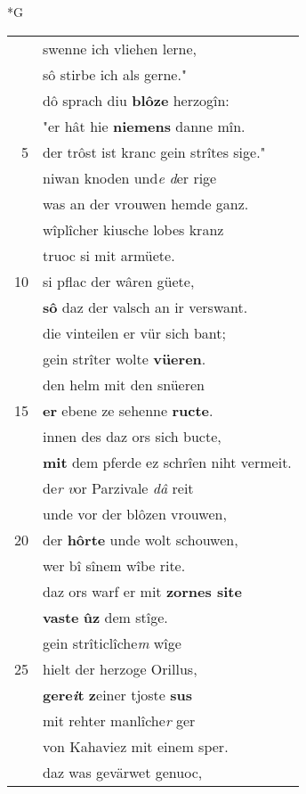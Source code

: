 \documentclass[8pt,a4paper,notitlepage]{article}
\begin{document}
\begin{table}[ht]
\begin{minipage}[t]{0.5\linewidth}
\small
\begin{center}*G
\end{center}
\begin{tabular}{rl}
 & swenne ich vliehen lerne,\\ 
 & sô stirbe ich als gerne."\\ 
 & dô sprach diu \textbf{blôze} herzogîn:\\ 
 & "er hât hie \textbf{niemens} danne mîn.\\ 
5 & der trôst ist kranc gein strîtes sige."\\ 
 & niwan knoden und\textit{e d}er rige\\ 
 & was an der vrouwen hemde ganz.\\ 
 & wîplîcher kiusche lobes kranz\\ 
 & truoc si mit armüete.\\ 
10 & si pflac der wâren güete,\\ 
 & \textbf{sô} daz der valsch an ir verswant.\\ 
 & die vinteilen er vür sich bant;\\ 
 & gein strîter wolte \textbf{vüeren}.\\ 
 & den helm mit den snüeren\\ 
15 & \textbf{er} ebene ze sehenne \textbf{ructe}.\\ 
 & innen des daz ors sich bucte,\\ 
 & \textbf{mit} dem pferde ez schrîen niht vermeit.\\ 
 & de\textit{r} \textit{v}or Parzivale \textit{dâ} reit\\ 
 & unde vor der blôzen vrouwen,\\ 
20 & der \textbf{hôrte} unde wolt schouwen,\\ 
 & wer bî sînem wîbe rite.\\ 
 & daz ors warf er mit \textbf{zornes site}\\ 
 & \textbf{vaste} \textbf{ûz} dem stîge.\\ 
 & gein strîticlîche\textit{m} wîge\\ 
25 & hielt der herzoge Orillus,\\ 
 & \textbf{gere\textit{i}t} \textbf{z}einer tjoste \textbf{sus}\\ 
 & mit rehter manlîche\textit{r} ger\\ 
 & von Kahaviez mit einem sper.\\ 
 & daz was gevärwet genuoc,\\ 

\end{tabular}
\end{minipage}
\end{table}
\end{document}
